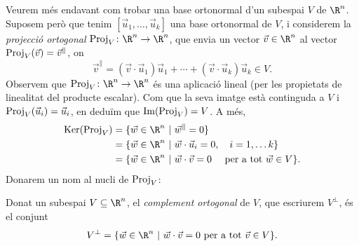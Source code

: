 Veurem més endavant com trobar una base ortonormal d'un subespai $V$ de $\R^n$. Suposem però que tenim $[\vec u_1,\ldots,\vec u_k]$ una base ortonormal de $V$, i considerem la \emph{projecció ortogonal} $\proj_V\colon \R^n\rightarrow \R^n$, que envia un vector $\vec v\in \R^n$ al vector $\operatorname{Proj}_V(\vec v) = \vec v^\parallel$, on
\[
\vec v^\parallel = (\vec v\cdot \vec u_1)\vec u_1 + \cdots + (\vec v\cdot \vec u_k)\vec u_k \in V.
\]
Observem que $\proj_V\colon \R^n\rightarrow \R^n$ és una aplicació lineal (per les propietats de linealitat del producte escalar). Com que la seva imatge està continguda a $V$ i $\operatorname{Proj}_V(\vec u_i) = \vec u_i$, en deduïm que $\operatorname{Im}(\operatorname{Proj}_V)=V$. A més,
\begin{align*}
\Ker(\proj_V) &= \{\vec w\in\R^n ~|~ \vec w^\parallel = 0\}\\
              &= \{\vec w\in\R^n ~|~ \vec w\cdot \vec u_i = 0, \quad i=1,\ldots k\}\\
              &= \{\vec w\in\R^n ~|~ \vec w\cdot \vec v = 0\quad\text{ per a tot }\vec w \in V\}.
\end{align*}
Donarem un nom al nucli de $\operatorname{Proj}_V$:

\begin{definicio}
Donat un subespai $V\subseteq \R^n$, el \emph{complement ortogonal} de $V$, que escriurem $V^\perp$, és el conjunt
\[
V^\perp = \{\vec w\in \R^n ~|~ \vec w\cdot \vec v = 0\text{ per a tot } \vec v\in V\}.
\]
\end{definicio}


